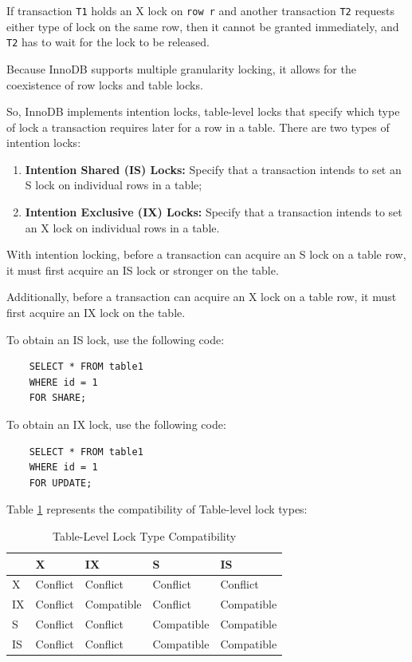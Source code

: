 \documentclass[12pt]{article}
\begin{document}
\vspace{0.3cm}

If transaction \verb|T1| holds an X lock on \verb|row r| and another transaction \verb|T2| requests either type of lock on the same row, then it cannot be granted immediately, and \verb|T2| has to wait for the lock to be released.

\vspace{0.3cm}

Because InnoDB supports multiple granularity locking, it allows for the coexistence of row locks and table locks. 

So, InnoDB implements intention locks, table-level locks that specify which type of lock a transaction requires later for a row in a table. There are two types of intention locks:

\begin{enumerate}
    \item \textbf{Intention Shared (IS) Locks:} Specify that a transaction intends to set an S lock on individual rows in a table;
    
    \item \textbf{Intention Exclusive (IX) Locks:} Specify that a transaction intends to set an X lock on individual rows in a table.
    
\end{enumerate}

\vspace{0.3cm}

With intention locking, before a transaction can acquire an S lock on a table row, it must first acquire an IS lock or stronger on the table.

Additionally, before a transaction can acquire an X lock on a table row, it must first acquire an IX lock on the table.

\newpage
To obtain an IS lock, use the following code:
\begin{verbatim}
    SELECT * FROM table1
    WHERE id = 1
    FOR SHARE;
\end{verbatim}

To obtain an IX lock, use the following code:
\begin{verbatim}
    SELECT * FROM table1
    WHERE id = 1
    FOR UPDATE;
\end{verbatim}

Table \ref{locksTable} represents the compatibility of Table-level lock types:
\begin{table}[h!]
\caption{Table-Level Lock Type Compatibility}
\centering
\begin{tabular}{ |p{2cm}||p{2cm}|p{2cm}|p{2cm}|p{2cm}|   }
 \hline
  & X & IX & S & IS\\
 \hline
 X & Conflict & Conflict & Conflict & Conflict\\
 IX & Conflict & Compatible & Conflict & Compatible\\
 S & Conflict & Conflict & Compatible & Compatible\\
 IS & Conflict & Conflict & Compatible & Compatible\\
 \hline
\end{tabular}
\label{locksTable}
\end{table}
\end{document}
